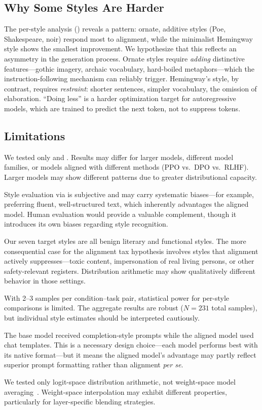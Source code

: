 \subsection{Why Some Styles Are Harder}
\label{sec:style_difficulty}

The per-style analysis () reveals a pattern: ornate,
additive styles (Poe, Shakespeare, noir) respond most to alignment, while the
minimalist Hemingway style shows the smallest improvement. We hypothesize that
this reflects an asymmetry in the generation process. Ornate styles require
\emph{adding} distinctive features---gothic imagery, archaic vocabulary,
hard-boiled metaphors---which the instruction-following mechanism can reliably
trigger. Hemingway's style, by contrast, requires \emph{restraint}: shorter
sentences, simpler vocabulary, the omission of elaboration. ``Doing less'' is a
harder optimization target for autoregressive models, which are trained to predict
the next token, not to suppress tokens.

\subsection{Limitations}
\label{sec:limitations}

We tested only \qwenbase and \qweninst. Results may differ for larger models,
different model families, or models aligned with different methods (PPO vs.\ DPO
vs.\ RLHF). Larger models may show different patterns due to greater distributional
capacity.

Style evaluation via \gptjudge is subjective and may carry systematic
biases---for example, preferring fluent, well-structured text, which inherently
advantages the aligned model. Human evaluation would provide a valuable complement,
though it introduces its own biases regarding style recognition.

Our seven target styles are all benign literary and functional styles. The more
consequential case for the alignment tax hypothesis involves styles that alignment
actively suppresses---toxic content, impersonation of real living persons, or other
safety-relevant registers. Distribution arithmetic may show qualitatively different
behavior in those settings.

With 2--3 samples per condition--task pair, statistical power for per-style
comparisons is limited. The aggregate results are robust ($N = 231$ total samples),
but individual style estimates should be interpreted cautiously.

The base model received completion-style prompts while the aligned model used chat
templates. This is a necessary design choice---each model performs best with its
native format---but it means the aligned model's advantage may partly reflect
superior prompt formatting rather than alignment \emph{per se}.

We tested only logit-space distribution arithmetic, not weight-space model
averaging~\cite{lin2023mitigating}. Weight-space interpolation may exhibit
different properties, particularly for layer-specific blending strategies.

